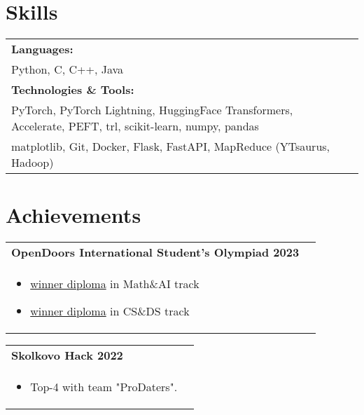 \documentclass[a4paper,8pt]{article}
\begin{document}
\section{Skills}
\begin{tabularx}{\linewidth}{ @{}l r@{} }
    \color[HTML]{1C033C}\textbf{Languages:} \\[2pt]
    \color[HTML]{371e77} \hspace*{4ex} Python, C, C++, Java\\[3pt]
    \color[HTML]{1C033C}\textbf{Technologies \& Tools:} \\[2pt]
    \color[HTML]{371e77} \hspace*{4ex} PyTorch, PyTorch Lightning, HuggingFace Transformers, Accelerate, PEFT, trl, scikit-learn, numpy, pandas\\[2pt]
    \color[HTML]{371e77} \hspace*{4ex} matplotlib, Git, Docker, Flask, FastAPI, MapReduce (YTsaurus, Hadoop)
\end{tabularx}

\section{Achievements}
\begin{tabularx}{\linewidth}{ @{}l r@{} }
    \color[HTML]{1C033C} \textbf{OpenDoors International Student's Olympiad 2023}\\[5pt]
    \begin{minipage}[t]{\linewidth}
        \begin{itemize}[nosep,after=\strut, leftmargin=2em, itemsep=2pt]
            \item \href{https://github.com/mumtozee/Documents/blob/main/opendoors_math_winner_en.pdf}{winner diploma} in Math\&AI track
            \item \href{https://github.com/mumtozee/Documents/blob/main/opendoors_csds_winner_en.pdf}{winner diploma} in CS\&DS track
        \end{itemize}
    \end{minipage}
\end{tabularx}

\begin{tabularx}{\linewidth}{ @{}l r@{} }
    \color[HTML]{1C033C} \textbf{Skolkovo Hack 2022}\\[5pt]
    \begin{minipage}[t]{\linewidth}
        \begin{itemize}[nosep,after=\strut, leftmargin=2em, itemsep=2pt]
            \item Top-4 with team "ProDaters".
        \end{itemize}
    \end{minipage}
\end{tabularx}
\end{document}
